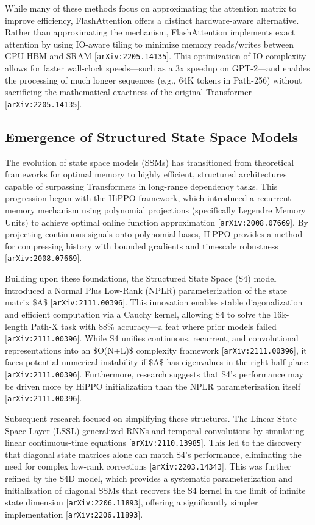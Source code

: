 \documentclass[11pt]{article}
\begin{document}
While many of these methods focus on approximating the attention matrix to improve efficiency, FlashAttention offers a distinct hardware-aware alternative. Rather than approximating the mechanism, FlashAttention implements exact attention by using IO-aware tiling to minimize memory reads/writes between GPU HBM and SRAM [\texttt{arXiv:2205.14135}]. This optimization of IO complexity allows for faster wall-clock speeds—such as a 3x speedup on GPT-2—and enables the processing of much longer sequences (e.g., 64K tokens in Path-256) without sacrificing the mathematical exactness of the original Transformer [\texttt{arXiv:2205.14135}].

\subsection{Emergence of Structured State Space Models}

The evolution of state space models (SSMs) has transitioned from theoretical frameworks for optimal memory to highly efficient, structured architectures capable of surpassing Transformers in long-range dependency tasks. This progression began with the HiPPO framework, which introduced a recurrent memory mechanism using polynomial projections (specifically Legendre Memory Units) to achieve optimal online function approximation [\texttt{arXiv:2008.07669}]. By projecting continuous signals onto polynomial bases, HiPPO provides a method for compressing history with bounded gradients and timescale robustness [\texttt{arXiv:2008.07669}].

Building upon these foundations, the Structured State Space (S4) model introduced a Normal Plus Low-Rank (NPLR) parameterization of the state matrix \$A\$ [\texttt{arXiv:2111.00396}]. This innovation enables stable diagonalization and efficient computation via a Cauchy kernel, allowing S4 to solve the 16k-length Path-X task with 88\% accuracy—a feat where prior models failed [\texttt{arXiv:2111.00396}]. While S4 unifies continuous, recurrent, and convolutional representations into an \$O(N+L)\$ complexity framework [\texttt{arXiv:2111.00396}], it faces potential numerical instability if \$A\$ has eigenvalues in the right half-plane [\texttt{arXiv:2111.00396}]. Furthermore, research suggests that S4's performance may be driven more by HiPPO initialization than the NPLR parameterization itself [\texttt{arXiv:2111.00396}].

Subsequent research focused on simplifying these structures. The Linear State-Space Layer (LSSL) generalized RNNs and temporal convolutions by simulating linear continuous-time equations [\texttt{arXiv:2110.13985}]. This led to the discovery that diagonal state matrices alone can match S4's performance, eliminating the need for complex low-rank corrections [\texttt{arXiv:2203.14343}]. This was further refined by the S4D model, which provides a systematic parameterization and initialization of diagonal SSMs that recovers the S4 kernel in the limit of infinite state dimension [\texttt{arXiv:2206.11893}], offering a significantly simpler implementation [\texttt{arXiv:2206.11893}].
\end{document}
